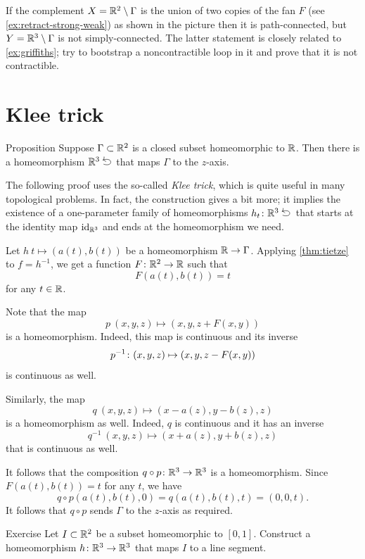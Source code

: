 If the complement $X=\mathbb{R}^2\setminus\Gamma$ is the union of two copies of the fan $F$ (see \ref{ex:retract-strong-weak}) as shown in the picture
then it is path-connected, but $Y\z=\RR^3\setminus\Gamma$ is not simply-connected.
The latter statement is closely related to \ref{ex:griffiths};
try to bootstrap a noncontractible loop in it and prove that it is not contractible.

\section{Klee trick}

\begin{thm}{Proposition}\label{prop:home-gamma-z-axis}
Suppose $\Gamma\subset\mathbb{R}^2$ is a closed subset homeomorphic to $\mathbb{R}$.
Then there is a homeomorphism $\RR^3\selfup$ that maps $\Gamma$ to the $z$-axis.
\end{thm}

The following proof uses the so-called \emph{Klee trick}, which is quite useful in many topological problems.
In fact, the construction gives a bit more; it implies the existence of a one-parameter family of homeomorphisms $h_t\:\RR^3\selfup$
that starts at the identity map $\mathrm{id}_{\mathbb{R}^3}$
and ends at the homeomorphism we need.

Let $h\:t\mapsto (a(t),b(t))$ be a homeomorphism $\mathbb{R}\to \Gamma$.
Applying \ref{thm:tietze} to $f=h^{-1}$, we get a function $F\:\RR^2\z\to\RR$ such that
\[F(a(t),b(t))=t\]
for any $t\in \mathbb{R}$.

Note that the map
\[p\:(x,y,z)\mapsto (x,y,z+F(x,y))\] is a homeomorphism.
Indeed, this map is continuous and its inverse
\[p^{-1}\:(x,y,z)\z\mapsto (x,y,z-F(x,y))\]
is continuous as well.

Similarly, the map
\[q\:(x,y,z)\mapsto (x-a(z),y-b(z),z)\]
is a homeomorphism as well.
Indeed, $q$ is continuous and it has an inverse
\[q^{-1}\:(x,y,z)\mapsto (x+a(z),y+b(z),z)\]
that is continuous as well.

It follows that the composition $q\circ p\colon\mathbb{R}^3\to\mathbb{R}^3$ is a homeomorphism.
Since $F(a(t),b(t))=t$ for any $t$, we have
\[q\circ p(a(t),b(t),0)=q(a(t),b(t),t)=(0,0,t).\]
It follows that $q\circ p$ sends $\Gamma$ to the $z$-axis as required.
\qeds

\begin{thm}{Exercise}\label{ex:klee[0,1]-1}
Let $I\subset \mathbb{R}^2$ be a subset homeomorphic to $[0,1]$.
Construct a homeomorphism $h\colon\mathbb{R}^3\to \mathbb{R}^3$ that maps $I$ to a line segment.
\end{thm}

